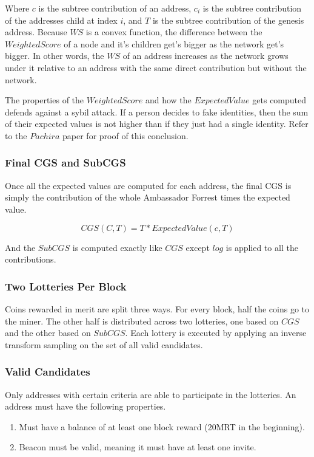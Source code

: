 \documentclass{article}
\begin{document}
Where $c$ is the subtree contribution of an address, $c_i$ is the subtree contribution of
the addresses child at index $i$, and $T$ is the subtree contribution of the 
genesis address.  Because $WS$ is a convex function, the difference between the
$Weighted Score$ of a node and it's children get's bigger as the network get's bigger.
In other words, the $WS$ of an address increases as the network grows under it
relative to an address with the same direct contribution but without the network.

The properties of the $Weighted Score$ and how the $Expected Value$ gets computed
defends against a sybil attack.  If a person decides to fake identities, then 
the sum of their expected values is not higher than if they just had a single 
identity. Refer to the $Pachira$ \cite{pachira} paper for proof of this conclusion.

\subsubsection{Final CGS and SubCGS}

Once all the expected values are computed for each address, the final CGS is simply
the contribution of the whole Ambassador Forrest times the expected value.

$$ CGS(C, T) = T*ExpectedValue(c, T)$$

And the $SubCGS$ is computed exactly like $CGS$ except $log$ is applied to all the
contributions.

\subsubsection{Two Lotteries Per Block}

Coins rewarded in merit are split three ways.  For every block, half the coins go
to the miner.  The other half is distributed across two lotteries, one based on 
$CGS$ and the other based on $SubCGS$.  Each lottery is executed by applying
an inverse transform sampling on the set of all valid candidates.

\subsubsection{Valid Candidates}

Only addresses with certain criteria are able to participate in the lotteries. 
An address must have the following properties.

\begin{enumerate}
    \item Must have a balance of at least one block reward (20MRT in the beginning).
    \item Beacon must be valid, meaning it must have at least one invite.
\end{enumerate}
\end{document}
